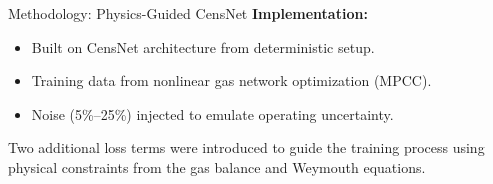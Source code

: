 \documentclass[hyperref={colorlinks,citecolor=blue,linkcolor=blue,urlcolor=blue}]{beamer}
\begin{document}
\begin{frame}{Methodology: Physics-Guided CensNet}
\footnotesize
\textbf{Implementation:}
\begin{itemize}
    \item Built on CensNet architecture from deterministic setup.
    \item Training data from nonlinear gas network optimization (MPCC).
    \item Noise (5\%–25\%) injected to emulate operating uncertainty.
\end{itemize}
\vspace{0.5em}
\centering
    \resizebox{0.95\linewidth}{!}{}

\vspace{0.8em}
Two additional loss terms were introduced to guide the training process using physical constraints from the gas balance and Weymouth equations.
\end{frame}
\end{document}
